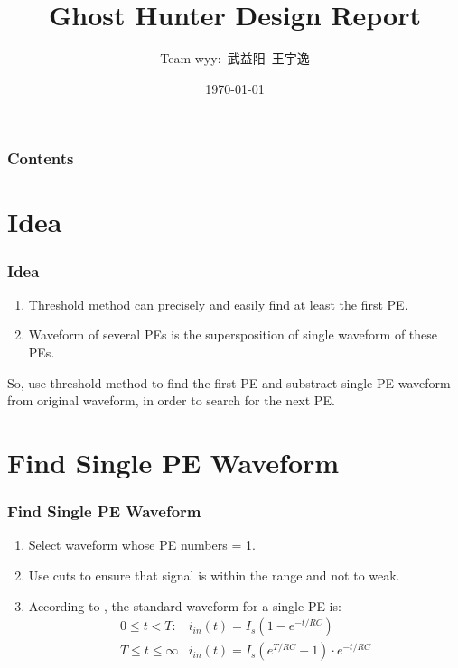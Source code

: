\documentclass{beamer}
\title{Ghost Hunter Design Report}
\author{Team wyy:\ 武益阳\ 王宇逸}
\date{\today}
\begin{document}
\begin{frame}
    \titlepage
\end{frame}

\begin{frame}
    \frametitle{Contents}
    \tableofcontents
\end{frame}

\section{Idea}
\begin{frame}
    \frametitle{Idea}
    \large
    \begin{enumerate}
        \item Threshold method can precisely and easily find at least the first PE. \pause
        \item Waveform of several PEs is the supersposition of single waveform of these PEs. \pause
    \end{enumerate}
    
    So, use threshold method to find the first PE and substract single PE waveform from original waveform, in order to search for the next PE.
\end{frame}

\section{Find Single PE Waveform}
\begin{frame}
    \frametitle{Find Single PE Waveform}
    \large
    \begin{enumerate}
        \item Select waveform whose PE numbers = 1. \pause
        \item Use cuts to ensure that signal is within the range and not to weak. \pause
        \item According to \cite{spieler2002pulse}, the standard waveform for a single PE is:\\
        \begin{equation*}
        \begin{array}{ll}{0 \leq t<T :} & {i_{i n}(t)=I_{s}\left(1-e^{-t / R C}\right)} \\ {T \leq t \leq \infty} & {i_{i n}(t)=I_{s}\left(e^{T / R C}-1\right) \cdot e^{-t / R C}}\end{array}
        \end{equation*}
    \end{enumerate}
\end{frame}
\end{document}
